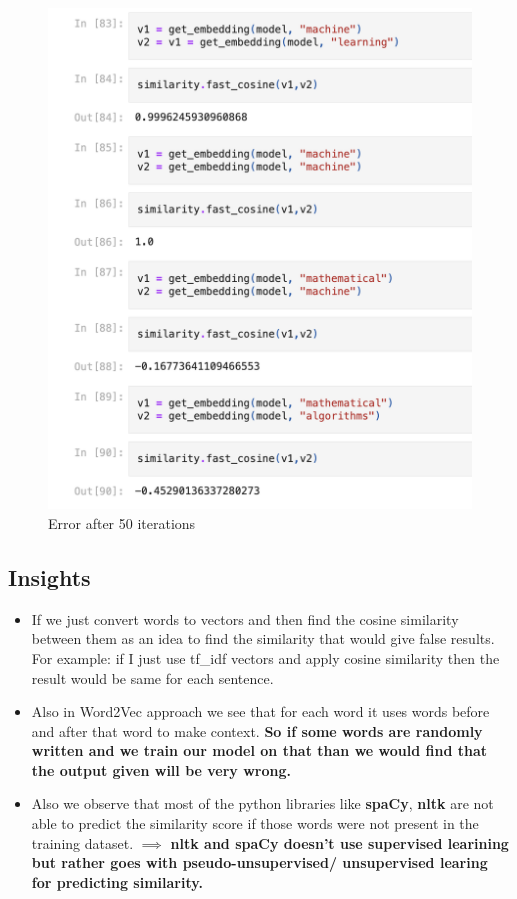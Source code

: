 \documentclass{article}
\begin{document}
\begin{figure}[htbp]
        \centering
        \includegraphics[width=0.5\linewidth]{task1_Untrained_demo.png}
        \caption{Error after 50 iterations}
        \label{fig:enter-label}
\end{figure}

\newpage
\subsection{Insights}
\begin{itemize}
    \item If we just convert words to vectors and then find the cosine similarity between them as an idea to find the similarity that would give false results.
    For example: if I just use tf\_idf vectors and apply cosine similarity then the result would be same for each sentence.
    \item Also in Word2Vec approach we see that for each word it uses words before and after that word to make context. \textbf{So if some words are randomly written and we train our model on that than we would find that the output given will be very wrong.}
    \item Also we observe that most of the python libraries like \textbf{spaCy}, \textbf{nltk} are not able to predict the similarity score if those words were not present in the training dataset. $\implies$ \textbf{nltk and spaCy doesn't use supervised learining but rather goes with pseudo-unsupervised/ unsupervised learing for predicting similarity.}
\end{itemize}


\newpage
\end{document}
